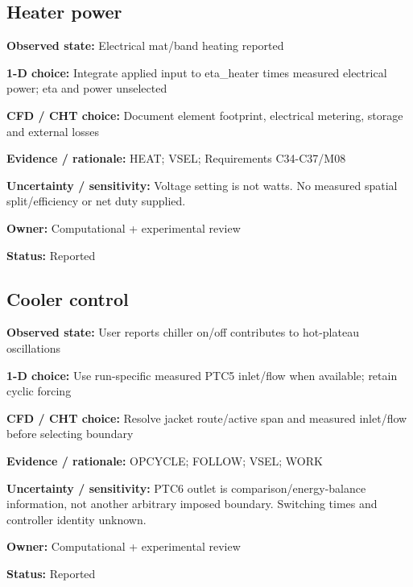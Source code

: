\documentclass[11pt]{article}
\begin{document}
\par\noindent\begin{minipage}{\textwidth}\small\setlength{\parskip}{2pt}
\subsection*{Heater power}
\textbf{Observed state:} Electrical mat/band heating reported\par
\textbf{1-D choice:} Integrate applied input to eta\_\allowbreak{}heater times measured electrical power; eta and power unselected\par
\textbf{CFD / CHT choice:} Document element footprint, electrical metering, storage and external losses\par
\textbf{Evidence / rationale:} HEAT; VSEL; Requirements C34-C37/M08\par
\textbf{Uncertainty / sensitivity:} Voltage setting is not watts. No measured spatial split/efficiency or net duty supplied.\par
\textbf{Owner:} Computational + experimental review\par
\textbf{Status:} Reported\par
\end{minipage}\par\vspace{5pt}
\par\noindent\begin{minipage}{\textwidth}\small\setlength{\parskip}{2pt}
\subsection*{Cooler control}
\textbf{Observed state:} User reports chiller on/off contributes to hot-plateau oscillations\par
\textbf{1-D choice:} Use run-specific measured PTC5 inlet/flow when available; retain cyclic forcing\par
\textbf{CFD / CHT choice:} Resolve jacket route/active span and measured inlet/flow before selecting boundary\par
\textbf{Evidence / rationale:} OPCYCLE; FOLLOW; VSEL; WORK\par
\textbf{Uncertainty / sensitivity:} PTC6 outlet is comparison/energy-balance information, not another arbitrary imposed boundary. Switching times and controller identity unknown.\par
\textbf{Owner:} Computational + experimental review\par
\textbf{Status:} Reported\par
\end{minipage}\par\vspace{5pt}
\end{document}
